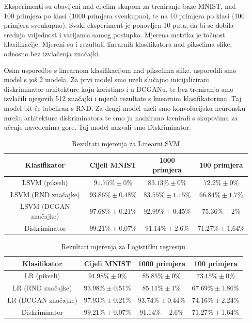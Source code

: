 \documentclass[times, utf8, diplomski]{fer}
\begin{document}
Eksperimenti su obavljeni nad cijelim skupom za treniranje baze MNIST, nad 100 primjera po klasi (1000 primjera sveukupno), te na 10 primjera po klasi (100 primjera sveukupno). Svaki eksperiment je ponovljen 10 puta, da bi se dobila srednja vrijednost i varijanca samog postupka. Mjerena metrika je točnost klasifikacije. Mjereni su i rezultati linearnih klasifikatora nad pikselima slike, odnosno bez izvlačenja značajki. \par 

Osim usporedbe s linearnom klasifikacijom nad pikselima slike, usporedili smo model s još 2 modela. Za prvi model smo uzeli slučajno inicijalizirani diskriminator arhitekture koju koristimo i u DCGANu, te bez treniranja smo izvlačili njegovih 512 značajki i mjerili rezultate s linearnim klasifikatorima. Taj model bit će labeliran s RND. Za drugi model uzeli smo konvolucijsku neuronsku mrežu arhitekture diskriminatora te smo ju nadzirano trenirali s skupovima za učenje navedenima gore. Taj model nazvali smo Diskriminator.

\begin{table}[H]
\caption{Rezultati mjerenja za Linearni SVM}
\centering
\begin{tabular}{c c c c}
\hline\hline %
Klasifikator & Cijeli MNIST & 1000 primjera & 100 primjera \\ [0.5ex] %
\hline %
LSVM (pikseli) & $91.75 \% \pm 0\%$ & $83.13 \% \pm 0\%$ & $72.2 \% \pm 0\%$ \\
LSVM (RND značajke) & $93.86 \% \pm 0.48\%$ & $83.55 \% \pm 1.15\%$ & $66.84 \% \pm 1.7\%$ \\
LSVM (DCGAN značajke) & $97.68 \% \pm 0.21\%$ & $92.99 \% \pm 0.45\%$ & $75.36 \% \pm 2\%$ \\
Diskriminator & $99.21 \% \pm 0.07\%$ & $91.14 \% \pm 2.6\%$ & $71.27 \% \pm 1.64\%$ \\ [1ex] %
\hline %
\end{tabular}
\end{table}

\begin{table}[H]
\caption{Rezultati mjerenja za Logističku regresiju}
\centering
\begin{tabular}{c c c c}
\hline\hline %
Klasifikator & Cijeli MNIST & 1000 primjera & 100 primjera \\ [0.5ex] %
\hline %
LR (pikseli) & $91.98 \% \pm 0\%$ & $85.85 \% \pm 0\%$ & $73.15 \% \pm 0\%$ \\
LR (RND značajke) & $93.98 \% \pm 0.51\%$ & $85.11 \% \pm 1\%$ & $67.69 \% \pm 1.86\%$ \\
LR (DCGAN značajke) & $97.93 \% \pm 0.21\%$ & $93.74 \% \pm 0.44\%$ & $74.16 \% \pm 2.24\%$ \\
Diskriminator & $99.21 \% \pm 0.07\%$ & $91.14 \% \pm 2.6\%$ & $71.27 \% \pm 1.64\%$ \\ [1ex] %
\hline %
\end{tabular}
\end{table}
\end{document}
